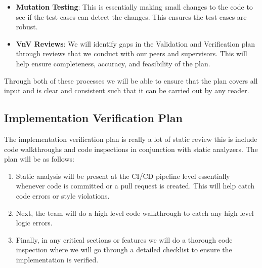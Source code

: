 \documentclass[12pt, titlepage]{article}
\begin{document}
\begin{itemize}
  \item \textbf{Mutation Testing}: This is essentially making small changes to the code to see if the test cases can detect the changes. This ensures the test cases are robust.
  
  \item \textbf{VnV Reviews}: We will identify gaps in the Validation and Verification plan through reviews that we conduct with our peers and supervisors. This will help ensure completeness, accuracy, and feasibility of the plan.
\end{itemize}

Through both of these processes we will be able to ensure that the plan covers all input and is clear and consistent such that it can be carried out by any reader.

\subsection{Implementation Verification Plan} \label{section:3.5}


The implementation verification plan is really a lot of static review this is include code walkthroughs and code inspections in conjunction with static analyzers. The plan will be as follows:

\begin{enumerate}
  \item Static analysis will be present at the CI/CD pipeline level essentially whenever code is committed or a pull request is created. This will help catch code errors or style violations.
  \item Next, the team will do a high level code walkthrough to catch any high level logic errors.
  \item Finally, in any critical sections or features we will do a thorough code inspection where we will go through a detailed checklist to ensure the implementation is verified.
\end{enumerate}
\end{document}
